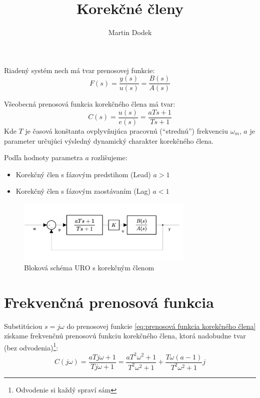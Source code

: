 \documentclass[a4paper,10pt]{article}
\begin{document}
\title{Korekčné členy}

\author{Martin Dodek}
\pagestyle{plain}
\maketitle


Riadený systém nech má tvar prenosovej funkcie:
\begin{equation}
\label{eq:riadený systém}
F(s)=\frac{y(s)}{u(s)}=\frac{B(s)}{A(s)}
\end{equation}

Všeobecná prenosová funkcia korekčného člena má tvar:
\begin{equation}
 \label{eq:prenosová funkcia korekčného člena}
 C(s)=\frac{u(s)}{e(s)}=\frac{aTs+1}{Ts+1}
\end{equation}
Kde $T$ je časová konštanta ovplyvňujúca pracovnú (``strednú'') frekvenciu $\omega_m$, $a$ je parameter určujúci výsledný dynamický charakter korekčného člena.

Podľa hodnoty parametra $a$ rozlišujeme:
\begin{itemize}
	\item Korekčný člen s fázovým predstihom (Lead) $a>1$
	\item Korekčný člen s fázovým zaostávaním (Lag) $a<1$
\end{itemize}

\begin{figure}[ht]
\centering
\includegraphics[width=0.75\textwidth]{blokova_schema}
\caption{Bloková schéma URO s korekčným členom}
\end{figure}


\section{Frekvenčná prenosová funkcia}
Substitúciou $s=j\omega$ do prenosovej funkcie \eqref{eq:prenosová funkcia korekčného člena} získame frekvenčnú prenosovú funkciu korekčného člena, ktorá nadobudne tvar (bez odvodenia)\footnote{Odvodenie si každý spraví sám}:
\begin{equation}
\label{eq:frekvenčná prenosová funkcia korekčného člena}
 C(j\omega)=\frac{aTj\omega+1}{Tj\omega+1}=\frac{aT^2\omega^2+1}{T^2\omega^2+1}+\frac{T\omega(a-1)}{T^2\omega^2+1}j
\end{equation}
\end{document}
